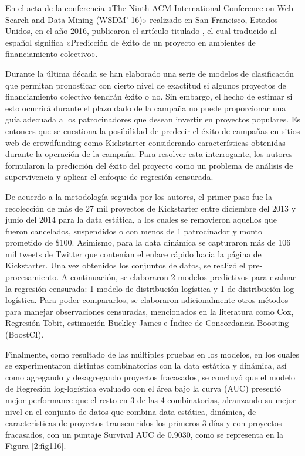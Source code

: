En el acta de la conferencia «The Ninth ACM International Conference on Web Search and Data Mining (WSDM’ 16)» realizado en San Francisco, Estados Unidos, en el año 2016, \cite{pr_li2016predcrowd} publicaron el artículo titulado , el cual traducido al español significa «Predicción de éxito de un proyecto en ambientes de financiamiento colectivo».

Durante la última década se han elaborado una serie de modelos de clasificación que permitan pronosticar con cierto nivel de exactitud si algunos proyectos de financiamiento colectivo tendrán éxito o no. Sin embargo, el hecho de estimar si esto ocurrirá durante el plazo dado de la campaña no puede proporcionar una guía adecuada a los patrocinadores que desean invertir en proyectos populares. Es entonces que se cuestiona la posibilidad de predecir el éxito de campañas en sitios web de crowdfunding como Kickstarter considerando características obtenidas durante la operación de la campaña. Para resolver esta interrogante, los autores formularon la predicción del éxito del proyecto como un problema de análisis de supervivencia y aplicar el enfoque de regresión censurada.

De acuerdo a la metodología seguida por los autores, el primer paso fue la recolección de más de 27 mil proyectos de Kickstarter entre diciembre del 2013 y junio del 2014 para la data estática, a los cuales se removieron aquellos que fueron cancelados, suspendidos o con menos de 1 patrocinador y monto prometido de \$100. Asimismo, para la data dinámica se capturaron más de 106 mil tweets de Twitter que contenían el enlace rápido hacia la página de Kickstarter. Una vez obtenidos los conjuntos de datos, se realizó el pre-procesamiento. A continuación, se elaboraron 2 modelos predictivos para evaluar la regresión censurada: 1 modelo de distribución logística y 1 de distribución log-logística. Para poder compararlos, se elaboraron adicionalmente otros métodos para manejar observaciones censuradas, mencionados en la literatura como Cox, Regresión Tobit, estimación Buckley-James e Índice de Concordancia Boosting (BoostCI).

Finalmente, como resultado de las múltiples pruebas en los modelos, en los cuales se experimentaron distintas combinatorias con la data estática y dinámica, así como agregando y desagregando proyectos fracasados, se concluyó que el modelo de Regresión log-logística evaluado con el área bajo la curva (AUC) presentó mejor performance que el resto en 3 de las 4 combinatorias, alcanzando su mejor nivel en el conjunto de datos que combina data estática, dinámica, de características de proyectos transcurridos los primeros 3 días y con proyectos fracasados, con un puntaje Survival AUC de 0.9030, como se representa en la Figura \ref{2:fig116}.

